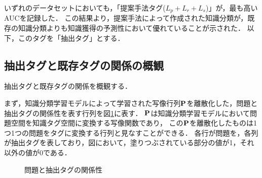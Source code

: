 いずれのデータセットにおいても，「提案手法タグ($L_p + L_r + L_s$)」が，最も高いAUCを記録した．
この結果より，提案手法によって作成された知識分類が，既存の知識分類よりも知識獲得の予測性において優れていることが示された．
以下，このタグを「抽出タグ」とする．


\subsection{抽出タグと既存タグの関係の概観}
抽出タグと既存タグの関係を概観する．

まず，知識分類学習モデルによって学習された写像行列${\bf P}$を離散化した，問題と抽出タグの関係性を表す行列を図\ref{fig:Discrete}に表す．
${\bf P}$は知識分類学習モデルにおいて問題空間を知識タグ空間に変換する写像関数であり，
この${\bf P}$を離散化したものは1つ1つの問題をタグに変換する行列と見なすことができる．
各行が問題を，各列が抽出タグを表しており，図において，塗りつぶされている部分の値が1，それ以外の値が0である．

\begin{figure}[htb]
\begin{center}
\hspace*{-20pt}
\end{center}
\caption{問題と抽出タグの関係性}
\label{fig:Discrete}
\end{figure}


